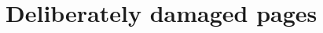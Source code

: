 \documentclass[twocolumn]{article}
\begin{document}
\section{Deliberately damaged pages}
\WBTextA\WBTextB\WBTextC\WBTextD\WBTextE\WBTextF
\end{document}
